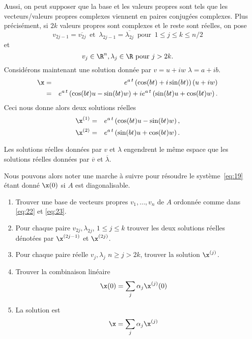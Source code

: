 Aussi, on peut supposer que la base et les valeurs propres sont tels que les vecteurs/valeurs propres complexes viennent en paires conjugées complexes. Plus précisément, si $2k$ valeurs propres sont complexes et le reste sont réelles, on pose
\begin{equation}
\label{eq:22}
  v_{2j-1} = \overline{v_{2j}}\, \text{ et } \, \lambda_{2j-1} = \overline{\lambda_{2j}} \, \text{ pour } \, 1 \leq j \leq k \leq n/2 
\end{equation}
et 
\begin{equation}
  \label{eq:23}  
  v_j \in \R^n, \lambda_j \in \R \text{ pour } j > 2k. 
\end{equation}
%
Considérons maintenant une solution donnée par $v = u+iw$  $\lambda= a+ib$. 
\begin{eqnarray*}
  \x & = & e^{a \, t} \left(\cos (b t)  + i \sin (b t ) \right)  (u + i w)  \\
   & = & e^{a \, t} \left(\cos (b t) u - \sin (bt)w \right)  + ie^{a \, t} \left(\sin (b t ) u + \cos(bt)w \right). 
\end{eqnarray*}
Ceci nous donne alors deux solutions réelles 
\begin{eqnarray*}
  \x^{(1)} & = & e^{a \, t} \left(\cos (b t) u - \sin (bt)w \right), \\
  \x^{(2)} & = &  e^{a \, t} \left(\sin (b t ) u + \cos(bt)w \right). 
\end{eqnarray*}
\begin{remark}
  \label{rem:2}
  Les solutions réelles données par $v$ et $\lambda$ engendrent le même espace que les solutions réelles données par $\overline{v}$ et $\overline{\lambda}$. 
\end{remark}

Nous pouvons alors noter une marche à suivre pour résoudre le système~\eqref{eq:19} étant donné $\x(0)$ si $A$ est diagonalisable.
\begin{enumerate}
\item Trouver une base de vecteurs propres $v_1,\dots,v_n$ de $A$ ordonnée comme dans \eqref{eq:22} et \eqref{eq:23}. 
\item Pour chaque paire $v_{2j},\lambda_{2j}$, $1 \leq j \leq k$ trouver les  deux solutions réelles dénotées par  $\x^{(2j-1)}$ et $\x^{(2j)}$. 
\item Pour chaque paire réelle $v_j, \lambda_j$ $n\geq j>2k$, trouver la solution $\x^{(j)}$. 
\item Trouver la combinaison linéaire 
  \begin{displaymath}
    \x(0) = \sum_{j} \alpha_j \x^{(j)}(0)
  \end{displaymath}
\item La solution est 
  \begin{displaymath}
    \x = \sum_{j} \alpha_j \x^{(j)} 
  \end{displaymath}
\end{enumerate}



